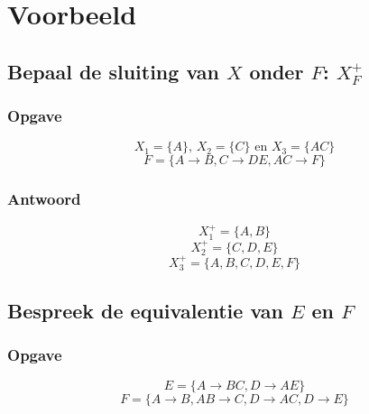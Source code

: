 \documentclass[normaalvormen.tex]{subfiles}
\begin{document}
\chapter{Voorbeeld}
\renewcommand\thesection{V\arabic{section}}
\renewcommand\thesubsection{V\arabic{section}}
\section{Bepaal de sluiting van $X$ onder $F$: $X_{F}^{+}$}
\subsection*{Opgave}
\[
X_1 = \{A\}\text{, }
X_2 = \{C\}\text{ en }
X_3 = \{AC\}
\]
\[
F = 
\{
  A\rightarrow B
, C\rightarrow DE
, AC \rightarrow F
\}
\]

\subsection*{Antwoord}
\[
X_1^{+} = \{A,B\}
\]
\[
X_{2}^{+} = \{C,D,E\}
\]
\[
X_{3}^{+} = \{A,B,C,D,E,F\}
\]

\section{Bespreek de equivalentie van $E$ en $F$}
\subsection*{Opgave}
\[
E = \{ A\rightarrow BC, D\rightarrow AE\}
\]
\[
F = \{A\rightarrow B, AB\rightarrow C, D\rightarrow AC, D\rightarrow E\}
\]
\end{document}
